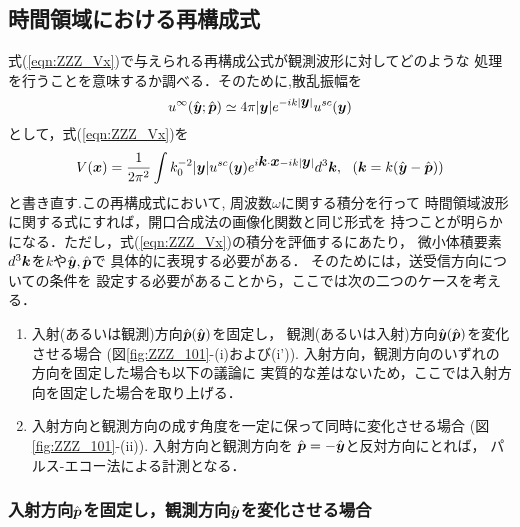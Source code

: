 \subsection{時間領域における再構成式}
式(\ref{eqn:ZZZ_Vx})で与えられる再構成公式が観測波形に対してどのような
処理を行うことを意味するか調べる．そのために,散乱振幅を
\begin{equation}
	u^{\infty}(\hat{\mbox{\boldmath $y$}};\hat{\mbox{\boldmath $p$}}) 
	\simeq 
	4\pi |\mbox{\boldmath $y$}|e^{-ik|\mbox{\boldmath $y$}|} u^{sc}(\mbox{\boldmath $y$})
	\label{eqn:ZZZ_21}
\end{equation}
として，式(\ref{eqn:ZZZ_Vx})を
\begin{equation}
	V(\mbox{\boldmath $x$}) =\frac{1}{2\pi^2} \int k_0^{-2} |\mbox{\boldmath $y$}|u^{sc}(\mbox{\boldmath $y$})
	e^{i\mbox{\boldmath $k$}\cdot \mbox{\boldmath $x$}-ik |\mbox{\boldmath $y$}|}d^3\mbox{\boldmath $k$}, 
	\ \ (\mbox{\boldmath $k$}=k(\hat{\mbox{\boldmath $y$}}-\hat{\mbox{\boldmath $p$}}))
	\label{eqn:ZZZ_Vx_usc}
\end{equation}
と書き直す.この再構成式において, 周波数$\omega$に関する積分を行って
時間領域波形に関する式にすれば，開口合成法の画像化関数と同じ形式を
持つことが明らかになる．ただし，式(\ref{eqn:ZZZ_Vx})の積分を評価するにあたり，
微小体積要素$d^3\mbox{\boldmath $k$}$を$k$や$\hat{\mbox{\boldmath $y$}},\hat{\mbox{\boldmath $p$}}$で
具体的に表現する必要がある． そのためには，送受信方向についての条件を
設定する必要があることから，ここでは次の二つのケースを考える． 
\begin{enumerate}
\item
	入射(あるいは観測)方向$\hat{\mbox{\boldmath $p$}}(\hat{\mbox{\boldmath $y$}})$を固定し，
	観測(あるいは入射)方向$\hat{\mbox{\boldmath $y$}}(\hat{\mbox{\boldmath $p$}})$を変化させる場合
		(図\ref{fig:ZZZ_101}-(i)および(i')).
	入射方向，観測方向のいずれの方向を固定した場合も以下の議論に
	実質的な差はないため，ここでは入射方向を固定した場合を取り上げる．
\item
	入射方向と観測方向の成す角度を一定に保って同時に変化させる場合
	(図\ref{fig:ZZZ_101}-(ii)). 入射方向と観測方向を
	$\hat{\mbox{\boldmath $p$}}=-\hat{\mbox{\boldmath $y$}}$と反対方向にとれば，
	パルス-エコー法による計測となる．
\end{enumerate}
\subsubsection{
	入射方向$\hat{\mbox{\boldmath $p$}}$を固定し，観測方向$\hat{\mbox{\boldmath $y$}}$を変化させる場合
}

